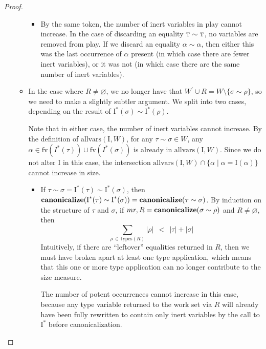 \documentclass[10pt, letterpaper, oneside]{article}
\newcommand{\inertset}{\text{I}}
\newcommand{\fv}{\mathrm{fv}}
\begin{document}
\begin{proof}
\begin{itemize}
\begin{itemize}
\begin{itemize}
        \item By the same token, the number of inert variables in play cannot increase. In the case of discarding an equality \(\text{\sc t} \sim \text{\sc t}\), no variables are removed from play. If we discard an equality \(\alpha \sim \alpha\), then either this was the last occurrence of \(\alpha\) present (in which case there are fewer inert variables), or it was not (in which case there are the same number of inert variables).

      \end{itemize}

      \item In the case where \(R \ne \varnothing\), we no longer have that \(W^\prime \cup R = W \setminus \{\sigma \sim \rho\}\), so we need to make a slightly subtler argument. We split into two cases, depending on the result of \(\inertset^\ast(\sigma) \sim \inertset^\ast(\rho)\).

      Note that in either case, the number of inert variables cannot increase. By the definition of \(\text{allvars}(\inertset, W)\), for any \(\tau \sim \sigma \in W\), any \(\alpha \in \fv(I^\ast(\tau)) \cup \fv(I^\ast(\sigma))\) is already in \(\text{allvars}(\inertset, W)\). Since we do not alter \(\inertset\) in this case, the intersection \(\text{allvars}(\inertset, W) \cap \{\alpha \mid \alpha = \inertset(\alpha)\}\) cannot increase in size.

      \begin{itemize}

        \item If \(\tau \sim \sigma = \inertset^\ast(\tau) \sim \inertset^\ast(\sigma)\), then \(\text{\bf canonicalize}(\inertset^\ast(\tau) \sim \inertset^\ast(\sigma)) = \text{\bf canonicalize}(\tau \sim \sigma)\). By induction on the structure of \(\tau\) and \(\sigma\), if \(mr, R = \text{\bf canonicalize}(\sigma \sim \rho)\) and \(R \ne \varnothing\), then
        \begin{equation*}
          \sum_{\rho\,\in\,\text{types}(R)}\!\!\!\!\!\!\!\!|\rho|\ \ <\ \ |\tau| + |\sigma|
        \end{equation*}
        Intuitively, if there are ``leftover'' equalities returned in \(R\), then we must have broken apart at least one type application, which means that this one or more type application can no longer contribute to the size measure.

        The number of potent occurrences cannot increase in this case, because any type variable returned to the work set via \(R\) will already have been fully rewritten to contain only inert variables by the call to \(\inertset^\ast\) before canonicalization.


\end{itemize}
\end{itemize}
\end{itemize}
\end{proof}
\end{document}
